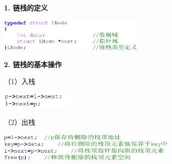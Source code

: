\textbf{{1. 链栈的定义}}

\textbf{\includegraphics[width=2.81250in,height=0.64583in]{png-jpeg-pics/E67CB7E9F1DDEE7B7F76081BFC0A855F.png}\\
}

\textbf{{2. 链栈的基本操作}}

（1）入栈

\includegraphics[width=1.35417in,height=0.31250in]{png-jpeg-pics/B40903111C8985FC06233A7AEA099426.png}

（2）出栈

\includegraphics[width=3.43750in,height=0.55208in]{png-jpeg-pics/7FDDA5961F623A82F98AD8A1A54D51D5.png}
